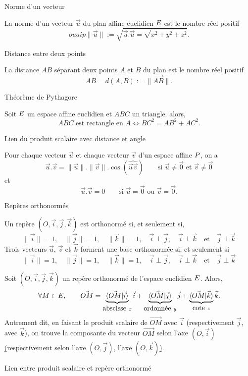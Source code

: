 \Concept [] Norme d'un vecteur

\noindent
La norme d'un vecteur $\vec u$ du plan affine euclidien $\sc E$ est le nombre réel positif 
$$ouaip
\|\vec u\|:=\sqrt{\vec u.\vec u=\sqrt{x^2+y^2+z^2}}. 
$$

\Concept [] Distance entre deux points

\noindent
La distance $AB$ séparant deux points $A$ et $B$ du plan est le nombre réel positif
$$
AB=d(A,B):=\|\vec{AB}\|. 
$$

\Concept [] Théorème de Pythagore

\noindent
Soit $\sc E$ un espace affine euclidien et $ABC$ un triangle. alors, 
$$
ABC \mbox{ est rectangle en }A \Longleftrightarrow BC^2=AB^2+AC^2.
$$

\Concept [] Lien du produit scalaire avec distance et angle

\noindent
Pour chaque vecteur $\vec u$ et chaque vecteur $\vec v$ d'un espace affine $\sc P$, on a 
$$
{\vec u.\vec v=\|\vec u\|.\|\vec v\|.\cos(\widehat{\mbox{$\vec u\vec v$}})}\qquad{\mbox{si }\vec u\neq\vec 0\mbox{ et }\vec v\neq\vec 0}
$$
et
$$
\vec u.\vec v=0\qquad\mbox{si }\vec u=\vec 0\mbox{ ou }\vec v=\vec 0.
$$

\Concept [] Repères orthonormés

\noindent
Un repère $(O,\vec i,\vec j,\vec k)$ est orthonormé si, et seulement si, 
$$
\|\vec i\|=1, \quad \|\vec j\|=1, \quad \|\vec  k\|=1,  \quad  \vec  i\perp\vec  j,  
\quad  \vec i\perp\vec k \quad\mbox{et}\quad \vec j\perp\vec k 
$$
\medskip \noindent Trois vecteurs $\vec u$, $\vec v$ et
$\vec  k$  forment  une  base  orthonormée  si,  et  seulement  si  $$  \|\vec  i\|=1,  \quad
\|\vec   j\|=1,   \quad   \|\vec   k\|=1,   \quad   \vec   i\perp\vec  j,  \quad
\vec i\perp\vec k \quad\mbox{et}\quad \vec j\perp\vec k $$ \medskip

\Propriete []  Soit $(O,\vec i,\vec j,\vec k)$ un repère orthonormé de l'espace euclidien $\sc E$. Alors, 
$$
\forall M\in\sc E, \qquad \vec{OM}=\underbrace{\langle \vec{OM}|\vec i\rangle}_{\mbox{abscisse }x}\vec i+\underbrace{\langle \vec{OM}|\vec j\rangle}_{\mbox{ordonnée }y}\vec j
+\underbrace{\langle \vec{OM}|\vec k\rangle}_{\mbox{cote }z}\vec k.
$$ 
Autrement dit, en faisant le produit scalaire de $\vec{OM}$ avec $\vec i$ (respectivement $\vec j$, avec $\vec k$), on trouve la composante du vecteur $\vec {OM}$ selon l'axe $(O,\vec i)$ \b(respectivement selon l'axe $(O,\vec j)$, 
l'axe $(O,\vec k)$\b). 


\Concept [] Lien entre produit scalaire et repère orthonormé

